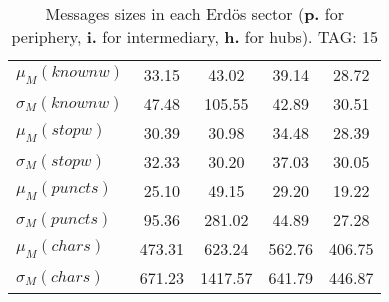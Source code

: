 \begin{table}[h!]
\begin{center}
\begin{tabular}{| l || c | c | c | c |}
$\mu_M(knownw)$ & 33.15  & 43.02  & 39.14  & 28.72 \\
$\sigma_M(knownw)$ & 47.48  & 105.55  & 42.89  & 30.51 \\\hline
$\mu_M(stopw)$ & 30.39  & 30.98  & 34.48  & 28.39 \\
$\sigma_M(stopw)$ & 32.33  & 30.20  & 37.03  & 30.05 \\\hline
$\mu_M(puncts)$ & 25.10  & 49.15  & 29.20  & 19.22 \\
$\sigma_M(puncts)$ & 95.36  & 281.02  & 44.89  & 27.28 \\\hline
$\mu_M(chars)$ & 473.31  & 623.24  & 562.76  & 406.75 \\
$\sigma_M(chars)$ & 671.23  & 1417.57  & 641.79  & 446.87 \\\hline
\end{tabular}
\caption{Messages sizes in each Erd\"os sector ({{\bf p.}} for periphery, {{\bf i.}} for intermediary, {{\bf h.}} for hubs). TAG: 15}
\end{center}
\end{table}